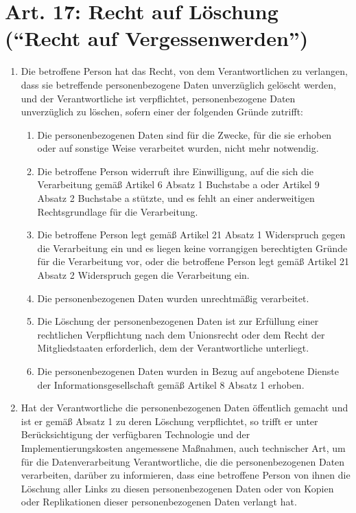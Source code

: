     \section[Art. 17 : Recht auf Löschung]{Art. 17: Recht auf Löschung (``Recht auf Vergessenwerden'')}
        \begin{enumerate}[label=(\arabic*)]
            \item Die betroffene Person hat das Recht, von dem Verantwortlichen zu verlangen, dass sie betreffende personenbezogene Daten unverzüglich gelöscht werden, und der Verantwortliche ist verpflichtet, personenbezogene Daten unverzüglich zu löschen, sofern einer der folgenden Gründe zutrifft:
                \begin{enumerate}[label=\alph*)]
                    \item Die personenbezogenen Daten sind für die Zwecke, für die sie erhoben oder auf sonstige Weise verarbeitet wurden, nicht mehr notwendig.
                    \item Die betroffene Person widerruft ihre Einwilligung, auf die sich die Verarbeitung gemäß Artikel 6 Absatz 1 Buchstabe a oder Artikel 9 Absatz 2 Buchstabe a stützte, und es fehlt an einer anderweitigen Rechtsgrundlage für die Verarbeitung.
                    \item Die betroffene Person legt gemäß Artikel 21 Absatz 1 Widerspruch gegen die Verarbeitung ein und es liegen keine vorrangigen berechtigten Gründe für die Verarbeitung vor, oder die betroffene Person legt gemäß Artikel 21 Absatz 2 Widerspruch gegen die Verarbeitung ein.
                    \item Die personenbezogenen Daten wurden unrechtmäßig verarbeitet. 
                    \item Die Löschung der personenbezogenen Daten ist zur Erfüllung einer rechtlichen Verpflichtung nach dem Unionsrecht oder dem Recht der Mitgliedstaaten erforderlich, dem der Verantwortliche unterliegt. 
                    \item Die personenbezogenen Daten wurden in Bezug auf angebotene Dienste der Informationsgesellschaft gemäß Artikel 8 Absatz 1 erhoben.
                \end{enumerate}
            \item Hat der Verantwortliche die personenbezogenen Daten öffentlich gemacht und ist er gemäß Absatz 1 zu deren Löschung verpflichtet, so trifft er unter Berücksichtigung der verfügbaren Technologie und der Implementierungskosten angemessene Maßnahmen, auch technischer Art, um für die Datenverarbeitung Verantwortliche, die die personenbezogenen Daten verarbeiten, darüber zu informieren, dass eine betroffene Person von ihnen die Löschung aller Links zu diesen personenbezogenen Daten oder von Kopien oder Replikationen dieser personenbezogenen Daten verlangt hat.

\end{enumerate}
